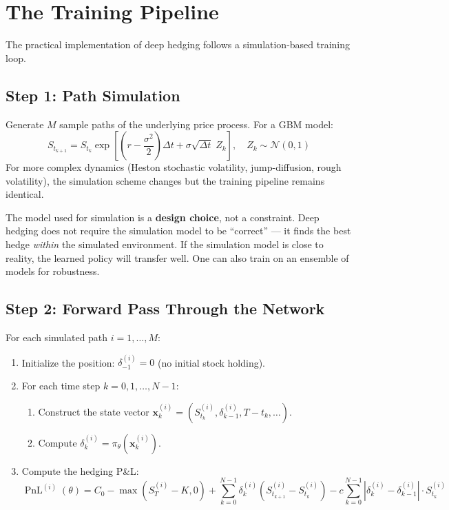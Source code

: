 \documentclass[11pt, a4paper]{article}
\theoremstyle{definition}
\theoremstyle{plain}
\theoremstyle{remark}
\newcommand{\PnL}{\operatorname{PnL}}
\begin{document}
\section{The Training Pipeline}
\label{sec:training-pipeline}

The practical implementation of deep hedging follows a simulation-based training loop.

\subsection{Step 1: Path Simulation}

Generate $M$ sample paths of the underlying price process.
For a GBM model:
\[
    S_{t_{k+1}} = S_{t_k} \exp\!\left[\left(r - \frac{\sigma^2}{2}\right)\Delta t
    + \sigma \sqrt{\Delta t}\; Z_k\right], \quad Z_k \sim \mathcal{N}(0,1)
\]
For more complex dynamics (Heston stochastic volatility, jump-diffusion, rough volatility),
the simulation scheme changes but the training pipeline remains identical.

\begin{keyidea}
The model used for simulation is a \textbf{design choice}, not a constraint.
Deep hedging does not require the simulation model to be ``correct'' ---
it finds the best hedge \emph{within} the simulated environment.
If the simulation model is close to reality, the learned policy will transfer well.
One can also train on an ensemble of models for robustness.
\end{keyidea}

\subsection{Step 2: Forward Pass Through the Network}

For each simulated path $i = 1, \ldots, M$:
\begin{enumerate}
    \item Initialize the position: $\delta_{-1}^{(i)} = 0$ (no initial stock holding).
    \item For each time step $k = 0, 1, \ldots, N-1$:
    \begin{enumerate}
        \item Construct the state vector $\bm{x}_k^{(i)} = (S_{t_k}^{(i)}, \delta_{k-1}^{(i)}, T - t_k, \ldots)$.
        \item Compute $\delta_k^{(i)} = \pi_\theta(\bm{x}_k^{(i)})$.
    \end{enumerate}
    \item Compute the hedging P\&L:
    \[
        \PnL^{(i)}(\theta) = C_0 - \max(S_T^{(i)} - K, 0)
        + \sum_{k=0}^{N-1} \delta_k^{(i)}(S_{t_{k+1}}^{(i)} - S_{t_k}^{(i)})
        - c \sum_{k=0}^{N-1} |\delta_k^{(i)} - \delta_{k-1}^{(i)}| \cdot S_{t_k}^{(i)}
    \]
\end{enumerate}
\end{document}
